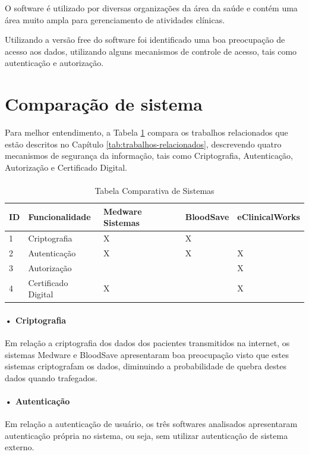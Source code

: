\documentclass[portuguese,oneside]{tcc}
\begin{document}
O software é utilizado por diversas organizações da área da saúde e contém uma área muito ampla para gerenciamento de atividades clínicas.

Utilizando a versão free do software foi identificado uma boa preocupação de acesso aos dados, utilizando alguns mecanismos de controle de acesso, tais como autenticação e autorização.

\section{Comparação de sistema}
Para melhor entendimento, a Tabela \ref{tab:comparativo} compara os trabalhos relacionados que estão descritos no Capítulo \ref{tab:trabalhos-relacionados}, descrevendo quatro mecanismos de segurança da informação, tais como Criptografia, Autenticação, Autorização e Certificado Digital.

\paragraph{ }
\begin{table}[htb]
\caption{Tabela Comparativa de Sistemas}\label{tab:comparativo}	
	\begin{center}
	\begin{tabular}{lllll}
	\toprule
	ID & Funcionalidade & Medware Sistemas & BloodSave & eClinicalWorks\\ 
	\midrule
	1 & Criptografia 	& X	& X	&  		\\
	2 & Autenticação	& X 	& X	& X		\\
	3 & Autorização 	&  	&  	& X		\\
    4 & Certificado Digital 	& X 	&  	& X		\\
	\bottomrule
	\end{tabular}
	\end{center}
\end{table}


\paragraph*{• Criptografia}
Em relação a criptografia dos dados dos pacientes transmitidos na internet, os sistemas Medware e BloodSave apresentaram boa preocupação visto que estes sistemas criptografam os dados, diminuindo a probabilidade de quebra destes dados quando trafegados.

\paragraph*{• Autenticação}
Em relação a autenticação de usuário, os três softwares analisados apresentaram autenticação própria no sistema, ou seja, sem utilizar autenticação de sistema externo.
\end{document}
